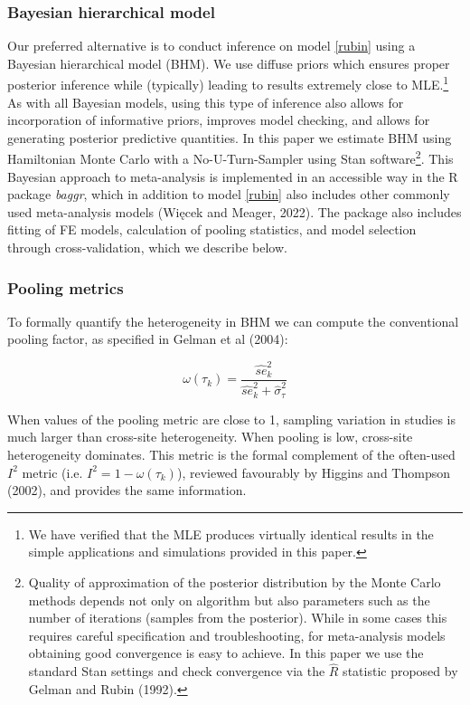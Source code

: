 \documentclass[12pt]{article}
\begin{document}
\subsubsection*{Bayesian hierarchical model}

Our preferred alternative is to conduct inference on model \eqref{rubin} using a Bayesian hierarchical model (BHM). We use diffuse priors which ensures proper posterior inference while (typically) leading to results extremely close to MLE.\footnote{We have verified that the MLE produces virtually identical results in the simple applications and simulations provided in this paper.} As with all Bayesian models, using this type of inference also allows for incorporation of informative priors, improves model checking, and allows for generating posterior predictive quantities. In this paper we estimate BHM using Hamiltonian Monte Carlo with a No-U-Turn-Sampler using Stan software\footnote{Quality of approximation of the posterior distribution by the Monte Carlo methods depends not only on algorithm but also parameters such as the number of iterations (samples from the posterior). While in some cases this requires careful specification and troubleshooting, for meta-analysis models obtaining good convergence is easy to achieve. In this paper we use the standard Stan settings and check convergence via the $\hat{R}$ statistic proposed by Gelman and Rubin (1992).}. This Bayesian approach to meta-analysis is implemented in an accessible way in the R package \textit{baggr}, which in addition to model \eqref{rubin} also includes other commonly used meta-analysis models (Więcek and Meager, 2022). The package also includes fitting of FE models, calculation of pooling statistics, and model selection through cross-validation, which we describe below.

\subsubsection*{Pooling metrics}

To formally quantify the heterogeneity in BHM we can compute the conventional pooling factor, as specified in Gelman et al (2004):

\begin{equation}
\omega(\tau_k) = \frac{\hat{se}^2_k }{\hat{se}^2_k + \hat{\sigma}_{\tau}^2 }
\end{equation}

When values of the pooling metric are close to 1, sampling variation in studies is much larger than cross-site heterogeneity. When pooling is low, cross-site heterogeneity dominates. This metric is the formal complement of the often-used $I^2$ metric (i.e. $I^2 = 1- \omega(\tau_k)$), reviewed favourably by Higgins and Thompson (2002), and provides the same information. 
\end{document}
